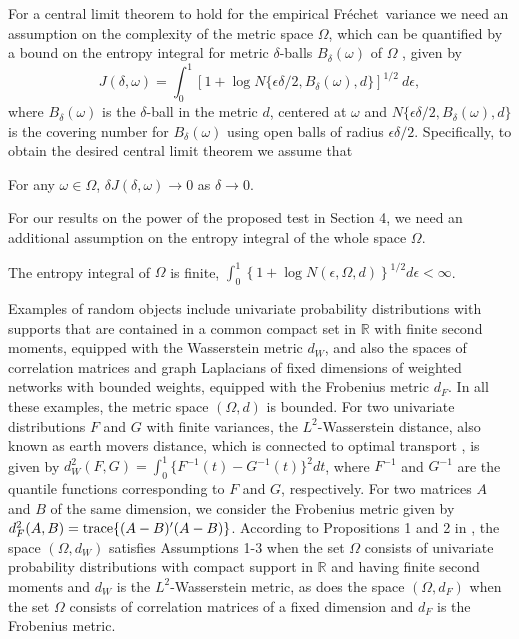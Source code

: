 \documentclass[lineno]{biometrika}
\def\cp{\citep}
\def\trace{{\rm trace}}
\def\cp{\citep}
\def\o{\omega}
\def\O{\Omega}
\def\F{Fr\'{e}chet}
\begin{document}
For a central limit theorem to hold for the empirical \F \ variance we need an assumption  on the complexity of the metric space $\O$, which can be quantified by a bound on the entropy integral for metric $\delta$-balls $B_\delta(\o)$ 
of  $\O$ \cp{well:96}, given by 
\begin{equation*}
J(\delta,\o)=\int_{0}^{1} \left[1+\log N \{\epsilon\delta/2,B_\delta(\o),d\} \right]^{1/2} \ d\epsilon,
\end{equation*} 
where $B_\delta(\o)$ is the $\delta$-ball in the metric $d$, centered at $\o$ and $N\{\epsilon\delta/2,B_\delta(\o),d\}$ is the covering number for $B_\delta(\o)$ using open balls of radius $\epsilon\delta/2$. Specifically, to obtain the desired central limit theorem we assume that 
\begin{assumption}
 For any $\o \in \O$,	$\delta J(\delta,\o) \rightarrow 0$ as $\delta \rightarrow 0$.
\end{assumption}
For our results on the power of the proposed test in Section 4, we need an additional assumption on the entropy integral of the whole space $\O$.
\begin{assumption}
	The entropy integral of  $\O$ is finite,  $\int_{0}^{1} \left \{1+\log{N(\epsilon,\O,d)}\right \}^{1/2}d\epsilon < \infty$.
\end{assumption}	
Examples of random objects include univariate probability distributions with supports that are contained in a common compact set  in $\mathbb{R}$ with finite second moments, equipped with the Wasserstein metric $d_W$, and also the  spaces of correlation matrices and graph Laplacians of fixed dimensions of weighted networks with bounded weights, equipped with the Frobenius metric $d_F$.  {In all these examples, the metric space $(\O,d)$ is bounded.}  For two univariate distributions $F$ and $G$ with finite variances, the $L^2$-Wasserstein distance, also known as earth movers distance, which is connected to optimal transport  \cp{vill:03},  is given by $d^2_W(F,G)= \int_{0}^{1} \{F^{-1}(t)-G^{-1}(t)\}^2dt$, where $F^{-1}$ and $G^{-1}$ are the quantile functions corresponding to $F$ and $G$, respectively. For two matrices $A$ and $B$ of the  same dimension, we consider the  Frobenius metric given by $d^2_F(A,B)= \trace\{(A-B)'(A-B)\}$. According to Propositions 1 and 2 in \cite{mull:19:3}, the space $(\O,d_W)$ satisfies Assumptions 1-3 when the set $\O$  consists  of univariate probability distributions {with compact support} in $\mathbb{R}$ and having finite second moments and $d_W$ is the $L^2$-Wasserstein metric, as does the space $(\O,d_F)$ when the set $\O$  consists of correlation matrices of a fixed dimension and $d_F$ is the Frobenius metric.
\end{document}
